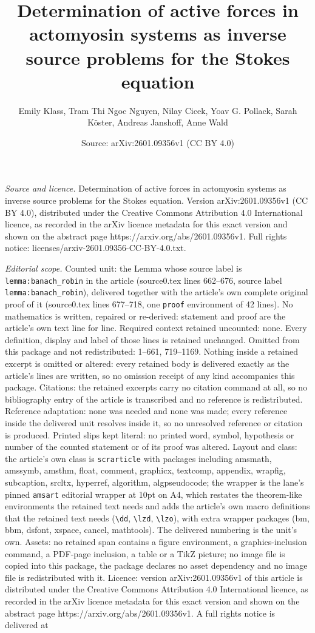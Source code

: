 \documentclass[10pt,a4paper]{amsart}
\title[Determination of active forces in actomyosin systems as inve]{Determination of active forces in actomyosin systems as inverse source problems for the Stokes equation}
\author{Emily Klass, Tram Thi Ngoc Nguyen, Nilay Cicek, Yoav G. Pollack, Sarah K\"oster, Andreas Janshoff, Anne Wald}
\date{Source: arXiv:2601.09356v1 (CC BY 4.0)}
\begin{document}
\maketitle

\noindent\emph{Source and licence.} Determination of active forces in actomyosin systems as inverse source problems for the Stokes equation. Version arXiv:2601.09356v1 (CC BY 4.0), distributed under the Creative Commons Attribution 4.0 International licence, as recorded in the arXiv licence metadata for this exact version and shown on the abstract page https://arxiv.org/abs/2601.09356v1. Full rights notice: licenses/arxiv-2601.09356-CC-BY-4.0.txt.\par\smallskip

\noindent\textit{Editorial scope.} Counted unit: the Lemma whose source label is \texttt{lemma:banach\_robin} in the article (source0.tex lines 662--676, source label \texttt{lemma:banach\_robin}), delivered together with the article's own complete original proof of it (source0.tex lines 677--718, one \texttt{proof} environment of 42 lines). No mathematics is written, repaired or re-derived: statement and proof are the article's own text line for line. Required context retained uncounted: none. Every definition, display and label of those lines is retained unchanged. Omitted from this package and not redistributed: 1--661, 719--1169. Nothing inside a retained excerpt is omitted or altered: every retained body is delivered exactly as the article's lines are written, so no omission receipt of any kind accompanies this package. Citations: the retained excerpts carry no citation command at all, so no bibliography entry of the article is transcribed and no reference is redistributed. Reference adaptation: none was needed and none was made; every reference inside the delivered unit resolves inside it, so no unresolved reference or citation is produced. Printed slips kept literal: no printed word, symbol, hypothesis or number of the counted statement or of its proof was altered. Layout and class: the article's own class is \texttt{scrarticle} with packages including amsmath, amssymb, amsthm, float, comment, graphicx, textcomp, appendix, wrapfig, subcaption, srcltx, hyperref, algorithm, algpseudocode; the wrapper is the lane's pinned \texttt{amsart} editorial wrapper at 10pt on A4, which restates the theorem-like environments the retained text needs and adds the article's own macro definitions that the retained text needs (\texttt{\textbackslash dd}, \texttt{\textbackslash lzd}, \texttt{\textbackslash lzo}), with extra wrapper packages (bm, bbm, dsfont, xspace, cancel, mathtools). The delivered numbering is the unit's own. Assets: no retained span contains a figure environment, a graphics-inclusion command, a PDF-page inclusion, a table or a TikZ picture; no image file is copied into this package, the package declares no asset dependency and no image file is redistributed with it. Licence: version arXiv:2601.09356v1 of this article is distributed under the Creative Commons Attribution 4.0 International licence, as recorded in the arXiv licence metadata for this exact version and shown on the abstract page https://arxiv.org/abs/2601.09356v1. A full rights notice is delivered at 
\end{document}
